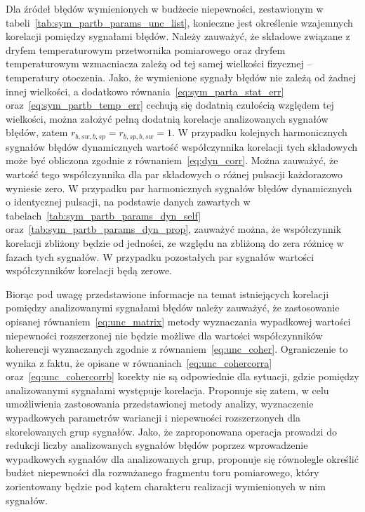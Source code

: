 Dla źródeł błędów wymienionych w budżecie niepewności, zestawionym w tabeli~\ref{tab:sym_partb_params_unc_list}, konieczne jest określenie wzajemnych korelacji pomiędzy sygnałami błędów. Należy zauważyć, że składowe związane z dryfem temperaturowym przetwornika pomiarowego oraz dryfem temperaturowym wzmacniacza zależą od tej samej wielkości fizycznej -- temperatury otoczenia. Jako, że wymienione sygnały błędów nie zależą od żadnej innej wielkości, a dodatkowo równania~\eqref{eq:sym_parta_stat_err} oraz~\eqref{eq:sym_partb_temp_err} cechują się dodatnią czułością względem tej wielkości, można założyć pełną dodatnią korelacje analizowanych sygnałów błędów, zatem $r_{b,sw,b,sp} = r_{b,sp,b,sw} = 1$. W przypadku kolejnych harmonicznych sygnałów błędów dynamicznych wartość współczynnika korelacji tych składowych może być obliczona zgodnie z równaniem~\eqref{eq:dyn_corr}. Można zauważyć, że wartość tego współczynnika dla par składowych o różnej pulsacji każdorazowo wyniesie zero. W przypadku par harmonicznych sygnałów błędów dynamicznych o identycznej pulsacji, na podstawie danych zawartych w tabelach~\ref{tab:sym_partb_params_dyn_self} oraz~\ref{tab:sym_partb_params_dyn_prop}, zauważyć można, że współczynnik korelacji zbliżony będzie od jedności, ze względu na zbliżoną do zera różnicę w fazach tych sygnałów. W przypadku pozostałych par sygnałów wartości współczynników korelacji będą zerowe.

Biorąc pod uwagę przedstawione informacje na temat istniejących korelacji pomiędzy analizowanymi sygnałami błędów należy zauważyć, że zastosowanie opisanej równaniem~\eqref{eq:unc_matrix} metody wyznaczania wypadkowej wartości niepewności rozszerzonej nie będzie możliwe dla wartości współczynników koherencji wyznaczanych zgodnie z równaniem~\eqref{eq:unc_coher}. Ograniczenie to wynika z faktu, że opisane w równaniach~\eqref{eq:unc_cohercorra} oraz~\eqref{eq:unc_cohercorrb} korekty nie są odpowiednie dla sytuacji, gdzie pomiędzy analizowanymi sygnałami występuje korelacja. Proponuje się zatem, w celu umożliwienia zastosowania przedstawionej metody analizy, wyznaczenie wypadkowych parametrów wariancji i niepewności rozszerzonych dla skorelowanych grup sygnałów. Jako, że zaproponowana operacja prowadzi do redukcji liczby analizowanych sygnałów błędów poprzez wprowadzenie wypadkowych sygnałów dla analizowanych grup, proponuje się równolegle określić budżet niepewności dla rozważanego fragmentu toru pomiarowego, który zorientowany będzie pod kątem charakteru realizacji wymienionych w nim sygnałów.

